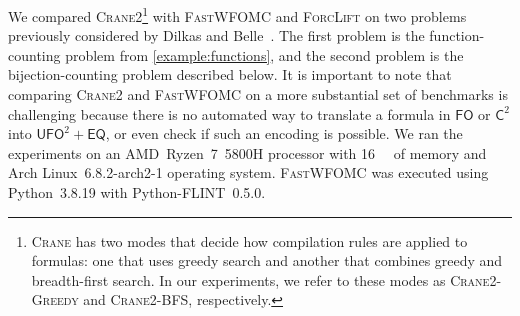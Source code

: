 \documentclass{article}
\theoremstyle{remark}
\newcommand{\Ctwo}{$\mathsf{C}^{2}$}
\newcommand{\FO}{$\mathsf{FO}$}
\newcommand{\UFO}{$\mathsf{UFO}^{2} + \mathsf{EQ}$}
\newcommand{\Cranetwo}{\textsc{Crane2}}
\newcommand{\Cranebfs}{\textsc{Crane2-BFS}}
\newcommand{\Cranegreedy}{\textsc{Crane2-Greedy}}
\begin{document}






We compared \Cranetwo{}\footnote{\textsc{Crane} has two modes that decide how
  compilation rules are applied to formulas: one that uses greedy search and
  another that combines greedy and breadth-first search. In our experiments, we
  refer to these modes as \Cranegreedy{} and \Cranebfs{}, respectively.} with
\textsc{FastWFOMC} and \textsc{ForcLift} on two problems previously considered
by Dilkas and Belle~. The first problem is the
function-counting problem from \cref{example:functions}, and the second problem
is the bijection-counting problem described below. It is important to note that
comparing \Cranetwo{} and \textsc{FastWFOMC} on a more substantial set of
benchmarks is challenging because there is no automated way to translate a
formula in \FO{} or \Ctwo{} into \UFO{}, or even check if such an encoding is
possible. We ran the experiments on an AMD~Ryzen~7~5800H processor with
\SI{16}{\gibi\byte} of memory and Arch Linux~6.8.2-arch2-1 operating system.
\textsc{FastWFOMC} was executed using Python~3.8.19 with Python-FLINT~0.5.0.
\end{document}
